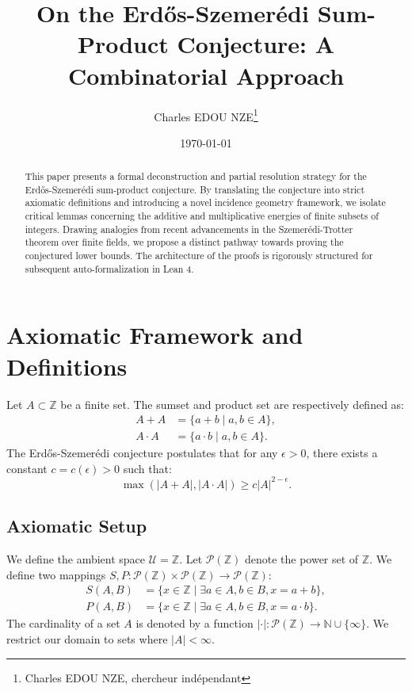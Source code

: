 \documentclass[11pt,a4paper]{article}
\title{On the Erdős-Szemerédi Sum-Product Conjecture: A Combinatorial Approach}
\author{Charles EDOU NZE\thanks{Charles EDOU NZE, chercheur indépendant}}
\date{\today}
\begin{document}
\maketitle

\begin{abstract}
This paper presents a formal deconstruction and partial resolution strategy for the Erdős-Szemerédi sum-product conjecture. By translating the conjecture into strict axiomatic definitions and introducing a novel incidence geometry framework, we isolate critical lemmas concerning the additive and multiplicative energies of finite subsets of integers. Drawing analogies from recent advancements in the Szemerédi-Trotter theorem over finite fields, we propose a distinct pathway towards proving the conjectured lower bounds. The architecture of the proofs is rigorously structured for subsequent auto-formalization in Lean 4.
\end{abstract}


\section{Axiomatic Framework and Definitions}
Let $A \subset \mathbb{Z}$ be a finite set. The sumset and product set are respectively defined as:
\begin{align*}
A + A &= \{a + b \mid a, b \in A\}, \\
A \cdot A &= \{a \cdot b \mid a, b \in A\}.
\end{align*}
The Erdős-Szemerédi conjecture postulates that for any $\epsilon > 0$, there exists a constant $c = c(\epsilon) > 0$ such that:
\begin{equation}
\max(|A + A|, |A \cdot A|) \geq c |A|^{2 - \epsilon}.
\end{equation}

\subsection{Axiomatic Setup}
We define the ambient space $\mathcal{U} = \mathbb{Z}$.
Let $\mathcal{P}(\mathbb{Z})$ denote the power set of $\mathbb{Z}$.
We define two mappings $S, P: \mathcal{P}(\mathbb{Z}) \times \mathcal{P}(\mathbb{Z}) \to \mathcal{P}(\mathbb{Z})$:
\begin{align*}
S(A, B) &= \{ x \in \mathbb{Z} \mid \exists a \in A, b \in B, x = a + b \}, \\
P(A, B) &= \{ x \in \mathbb{Z} \mid \exists a \in A, b \in B, x = a \cdot b \}.
\end{align*}
The cardinality of a set $A$ is denoted by a function $|\cdot|: \mathcal{P}(\mathbb{Z}) \to \mathbb{N} \cup \{\infty\}$. We restrict our domain to sets where $|A| < \infty$.
\end{document}
